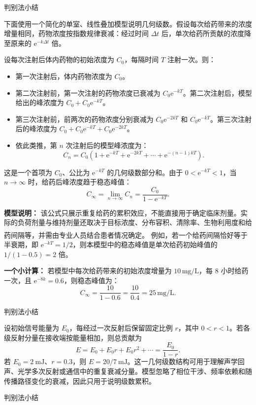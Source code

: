 \documentclass[aspectratio=169,10pt,fontset=fandol]{ctexbeamer}
\newcommand{\ee}{\mathrm{e}}
\newcommand{\upcite}[1]{\textsuperscript{\textsuperscript{\cite{#1}}}}
\begin{document}
\begin{frame}[t,fragile]{判别法小结}
\small
{\small
\begin{application}

下面使用一个简化的单室、线性叠加模型说明几何级数。假设每次给药带来的浓度增量相同，药物浓度按指数规律衰减：经过时间 \(\Delta t\) 后，单次给药所贡献的浓度降至原来的 \(\ee^{-k\Delta t}\) 倍。

设每次注射后体内药物的初始浓度为 \(C_0\)，每隔时间 \(T\) 注射一次。则：
\begin{itemize}
\item 第一次注射后，体内药物浓度为 \(C_0\)。
\item 第二次注射前，第一次注射的药物浓度已衰减为 \(C_0\ee^{-kT}\)。第二次注射后，模型给出的峰浓度为 \(C_0+C_0\ee^{-kT}\)。
\item 第三次注射前，前两次的药物浓度分别衰减为 \(C_0\ee^{-2kT}\) 和 \(C_0\ee^{-kT}\)。第三次注射后的峰浓度为 \(C_0+C_0\ee^{-kT}+C_0\ee^{-2kT}\)。
\item 依此类推，第 \(n\) 次注射后的模型峰浓度为：
\[
C_n=C_0\left(1+\ee^{-kT}+\ee^{-2kT}+\cdots+\ee^{-(n-1)kT}\right).
\]
\end{itemize}

这是一个首项为 \(C_0\)、公比为 \(\ee^{-kT}\) 的几何级数部分和。由于 \(0<\ee^{-kT}<1\)，当 \(n\to\infty\) 时，给药后峰浓度趋于稳态峰值：
\[
C_{\infty}=\lim_{n\to\infty}C_n=\frac{C_0}{1-\ee^{-kT}}.
\]

\textbf{模型说明：} 该公式只展示重复给药的累积效应，不能直接用于确定临床剂量。实际的负荷剂量与维持剂量还取决于目标浓度、分布容积、清除率、生物利用度和给药间隔等，并需由专业人员结合患者情况确定。\upcite{NCBISteadyState} 例如，若一个给药间隔恰好等于半衰期，即 \(\ee^{-kT}=1/2\)，则本模型中的稳态峰值是单次给药初始峰值的 \(1/(1-0.5)=2\) 倍。

\textbf{一个小计算：} 若模型中每次给药带来的初始浓度增量为 \(10\,\text{mg/L}\)，每 8 小时给药一次，且 \(\ee^{-8k}=0.6\)，则稳态峰值为：
\[
C_{\infty} = \frac{10}{1 - 0.6} = \frac{10}{0.4} = 25\,\text{mg/L}.
\]
\end{application}
}
\end{frame}
\begin{frame}[t,fragile]{判别法小结}
\small
{\small
\begin{application}[工程：多次反射与信号衰减]
设初始信号能量为 $E_0$，每经过一次反射后保留固定比例 $r$，其中 $0<r<1$。若各级反射分量在接收端按能量相加，则总贡献为
\[
E=E_0+E_0r+E_0r^2+\cdots
=\frac{E_0}{1-r}.
\]
若 $E_0=2\ \mathrm{mJ}$、$r=0.3$，则 $E=20/7\ \mathrm{mJ}$。这一几何级数结构可用于理解声学回声、光学多次反射或通信中的重复衰减分量。模型忽略了相位干涉、频率依赖和随传播路径变化的衰减，因此只用于说明级数累积。
\end{application}
}
\end{frame}
\begin{frame}[t,fragile]{判别法小结}
\small
{\small


\iffalse



}
\end{frame}
\end{document}
